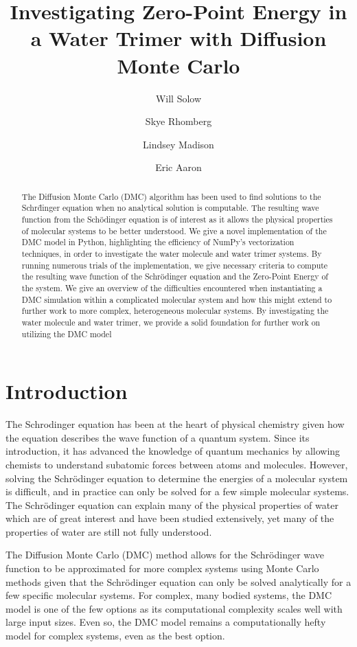 \documentclass[journal=jacsat,manuscript=article]{achemso}
\author{Will Solow}
\author{Skye Rhomberg}
\author{Lindsey Madison}
\author{Eric Aaron}
\affiliation[Colby College]
{Department of Computer Science, Colby College, Waterville, ME}
\title{Investigating Zero-Point Energy in a Water Trimer with Diffusion Monte Carlo}
\begin{document}
\begin{abstract}
The Diffusion Monte Carlo (DMC) algorithm has been used to find solutions to the Schr\"dinger equation when no analytical solution is computable. The resulting wave function from the Sch\"odinger equation is of interest as it allows the physical properties of molecular systems to be better understood. We give a novel implementation of the DMC model in Python, highlighting the efficiency of NumPy’s vectorization techniques, in order to investigate the water molecule and water trimer systems. By running numerous trials of the implementation, we give necessary criteria to compute the resulting wave function of the Schr\"odinger equation and the Zero-Point Energy of the system. We give an overview of the difficulties encountered when instantiating a DMC simulation within a complicated molecular system and how this might extend to further work to more complex, heterogeneous molecular systems. By investigating the water molecule and water trimer, we provide a solid foundation for further work on utilizing the DMC model
\end{abstract}


\section{Introduction}

The Schrodinger\cite{Schrodinger1926} equation has been at the heart of physical chemistry given how the equation describes the wave function of a quantum system. Since its introduction, it has advanced the knowledge of quantum mechanics by allowing chemists to understand subatomic forces between atoms and molecules. However, solving the Schr\"odinger equation to determine the energies of a molecular system is difficult, and in practice can only be solved for a few simple molecular systems. The Schr\"odinger equation can explain many of the physical properties of water which are of great interest and have been studied extensively\cite{Goldman2004,Gillan2013}, yet many of the properties of water are still not fully understood.\cite{Liu1996}

The Diffusion Monte Carlo\cite{Anderson1975} (DMC) method allows for the Schr\"odinger wave function to be approximated for more complex systems using Monte Carlo methods given that the Schr\"odinger equation can only be solved analytically for a few specific molecular systems.\cite{Faber1996,Pang2014} For complex, many bodied systems\cite{Lee2019,Veil2001}, the DMC model is one of the few options as its computational complexity scales well with large input sizes. Even so, the DMC model remains a computationally hefty model for complex systems, even as the best option. 
	
\end{document}
